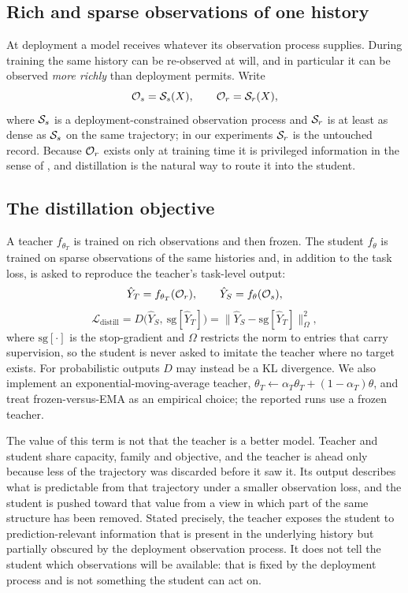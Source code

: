 \subsection{Rich and sparse observations of one history}
\label{sec:distill}
At deployment a model receives whatever its observation process supplies. During training the same history can be
re-observed at will, and in particular it can be observed \emph{more richly} than deployment permits. Write
\begin{equation}
\mathcal{O}_s=\mathcal{S}_s(X),\qquad \mathcal{O}_r=\mathcal{S}_r(X),
\label{eq:richsparse}
\end{equation}
where $\mathcal{S}_s$ is a deployment-constrained observation process and $\mathcal{S}_r$ is at least as dense as $\mathcal{S}_s$ on
the same trajectory; in our experiments $\mathcal{S}_r$ is the untouched record. Because $\mathcal{O}_r$ exists only at
training time it is privileged information in the sense of \cite{vapnik2015lupi}, and distillation
\cite{hinton2015distilling,lopezpaz2016unifying} is the natural way to route it into the student.

\subsection{The distillation objective}
A teacher $f_{\theta_T}$ is trained on rich observations and then frozen. The student $f_\theta$ is trained on
sparse observations of the same histories and, in addition to the task loss, is asked to reproduce the teacher's
task-level output:
\begin{equation}
\hat Y_T=f_{\theta_T}(\mathcal{O}_r),\qquad \hat Y_S=f_\theta(\mathcal{O}_s),
\label{eq:studteach}
\end{equation}
\begin{equation}
\mathcal{L}_{\mathrm{distill}}=D\big(\hat Y_S,\ \mathrm{sg}[\hat Y_T]\big)
=\big\|\hat Y_S-\mathrm{sg}[\hat Y_T]\big\|^{2}_{\Omega},
\label{eq:distill}
\end{equation}
where $\mathrm{sg}[\cdot]$ is the stop-gradient and $\Omega$ restricts the norm to entries that carry supervision,
so the student is never asked to imitate the teacher where no target exists. For probabilistic outputs $D$ may
instead be a KL divergence. We also implement an exponential-moving-average teacher,
$\theta_T\leftarrow\alpha_T\theta_T+(1-\alpha_T)\theta$, and treat frozen-versus-EMA as an empirical choice; the
reported runs use a frozen teacher.

The value of this term is not that the teacher is a better model. Teacher and student share capacity, family and
objective, and the teacher is ahead only because less of the trajectory was discarded before it saw it. Its output
describes what is predictable from that trajectory under a smaller observation loss, and the student is pushed
toward that value from a view in which part of the same structure has been removed. Stated precisely, the teacher
exposes the student to prediction-relevant information that is present in the underlying history but partially
obscured by the deployment observation process. It does not tell the student which observations will be available:
that is fixed by the deployment process and is not something the student can act on.

